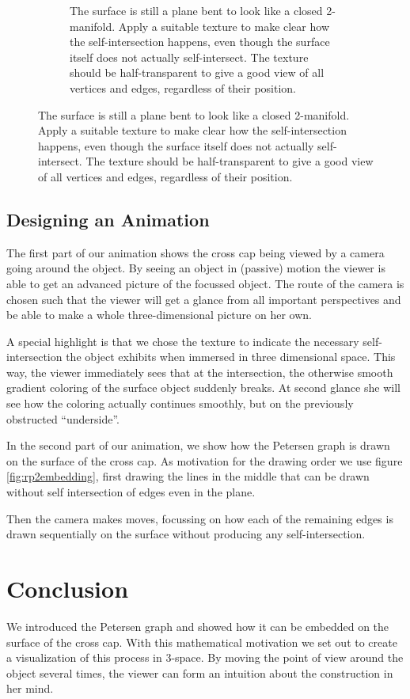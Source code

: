 \documentclass[11pt,            %
               a4paper,         %
               oneside,         %
               DIV12,           %
               fleqn,           %
               halfparskip,     %
               nochapterprefix, %
              ]{scrartcl} %
\theoremstyle{definition}
\begin{document}
\begin{figure}[h]
\begin{subfigure}[t]{0.49\textwidth}
    \caption{The surface is still a plane bent to look like a closed
      2-manifold. Apply a suitable texture to make clear how the
      self-intersection happens, even though the surface itself does
      not actually self-intersect. The texture should be
      half-transparent to give a good view of all vertices and edges,
      regardless of their position.}
  \end{subfigure}
\end{figure}

\subsection{Designing an Animation}

The first part of our animation shows the cross cap being viewed by a
camera going around the object. By seeing an object in (passive)
motion the viewer is able to get an advanced picture of the focussed
object. The route of the camera is chosen such that the viewer will
get a glance from all important perspectives and be able to make a whole
three-dimensional picture on her own.

A special highlight is that we chose the texture to indicate the
necessary self-intersection the object exhibits when immersed
in three dimensional space. This way, the viewer immediately sees that at the
intersection, the otherwise smooth gradient coloring
of the surface object suddenly breaks. At second glance she will see
how the coloring actually continues smoothly, but on the previously
obstructed “underside”.

In the second part of our animation, we show how the Petersen graph is drawn
on the surface of the cross cap. As motivation for the drawing order
we use figure \ref{fig:rp2embedding}, first drawing the lines in the
middle that can be drawn without self intersection of edges even in
the plane.

Then the camera makes moves, focussing on how each of the
remaining edges is drawn sequentially on the surface without producing any
self-intersection.

\section{Conclusion}

We introduced the Petersen graph and showed how it can be embedded on
the surface of the cross cap. With this mathematical motivation we set
out to create a visualization of this process in 3-space. By moving
the point of view around the object several times, the viewer can form
an intuition about the construction in her mind.


\nocite{*}


\end{document}
